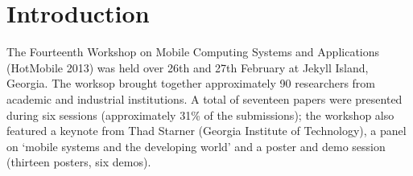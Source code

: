 \section{Introduction}
\label{sec:introduction}

The Fourteenth Workshop on Mobile Computing Systems and Applications (HotMobile 
2013) was held over 26th and 27th February at Jekyll Island, Georgia. The worksop 
brought together approximately 90 researchers from academic and industrial 
institutions. A total of seventeen papers were presented during six sessions 
(approximately 31\% of the submissions); the workshop also featured a keynote from  
Thad Starner (Georgia Institute of Technology), a panel on `mobile systems and the 
developing world' and a poster and demo session (thirteen posters, six demos).
